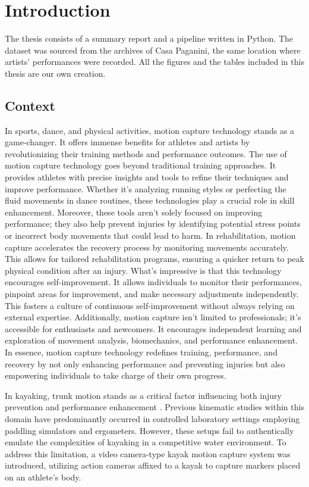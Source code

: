 \chapter{Introduction}
The thesis consists of a summary report and a pipeline written in Python.
The dataset was sourced from the archives of Casa Paganini, the same location where artists' performances were recorded. 
All the figures and the tables included in this thesis are our own creation.

\section{Context}
In sports, dance, and physical activities, motion capture technology stands as a game-changer.
It offers immense benefits for athletes and artists by revolutionizing their training methods and performance outcomes.
The use of motion capture technology goes beyond traditional training approaches.
It provides athletes with precise insights and tools to refine their techniques and improve performance.
Whether it's analyzing running styles or perfecting the fluid movements in dance routines, these technologies play a crucial role in skill enhancement.
Moreover, these tools aren't solely focused on improving performance; they also help prevent injuries by identifying potential stress points or incorrect body movements that could lead to harm.
In rehabilitation, motion capture accelerates the recovery process by monitoring movements accurately. This allows for tailored rehabilitation programs, ensuring a quicker return to peak physical condition after an injury.
What's impressive is that this technology encourages self-improvement.
It allows individuals to monitor their performances, pinpoint areas for improvement, and make necessary adjustments independently. This fosters a culture of continuous self-improvement without always relying on external expertise.
Additionally, motion capture isn't limited to professionals; it's accessible for enthusiasts and newcomers. It encourages independent learning and exploration of movement analysis, biomechanics, and performance enhancement.
In essence, motion capture technology redefines training, performance, and recovery by not only enhancing performance and preventing injuries but also empowering individuals to take charge of their own progress.


In kayaking, trunk motion stands as a critical factor influencing both injury prevention and performance enhancement \cite{kayak}.
Previous kinematic studies within this domain have predominantly occurred in controlled laboratory settings employing paddling simulators and ergometers.
However, these setups fail to authentically emulate the complexities of kayaking in a competitive water environment.
To address this limitation, a video camera-type kayak motion capture system was introduced, utilizing action cameras affixed to a kayak to capture markers placed on an athlete's body.

